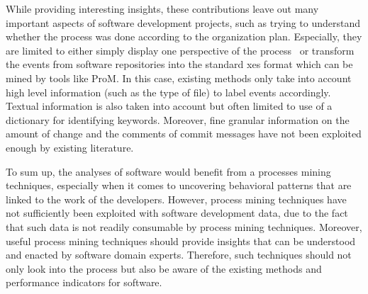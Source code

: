 While providing interesting insights, these contributions leave out many important aspects of software development projects, such as trying to understand whether the process was done according to the organization plan. Especially, they are limited to either simply display one perspective of the process~\citep{Song2007} or transform the events from software repositories into the standard \gls{xes} format which can be mined by tools like ProM. In this case, existing methods only take into account high level information (such as the type of file) to label events accordingly. Textual information is also taken into account \citep{rubin2007process} but often limited to use of a dictionary for identifying keywords. Moreover, fine granular information on the amount of change and the comments of commit messages have not been exploited enough by existing literature.



To sum up, the analyses of software would benefit from a processes mining techniques, especially when it comes to uncovering behavioral patterns that are linked to the work of the developers. However, process mining techniques have not sufficiently been exploited with software development data, due to the fact that such data is not readily consumable by process mining techniques. Moreover, useful process mining techniques should provide insights that can be understood and enacted by software domain experts. Therefore, such techniques should not only look into the process but also be aware of the existing methods and performance indicators for software.  








